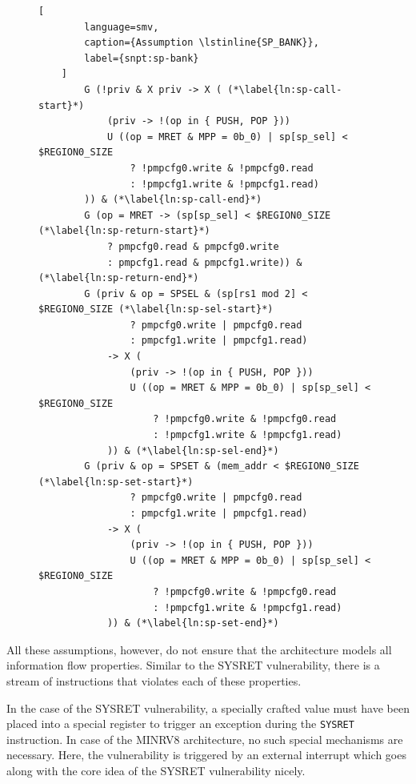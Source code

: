\begin{figure}
    \begin{lstlisting}[
        language=smv,
        caption={Assumption \lstinline{SP_BANK}},
        label={snpt:sp-bank}
    ]
        G (!priv & X priv -> X ( (*\label{ln:sp-call-start}*)
            (priv -> !(op in { PUSH, POP }))
            U ((op = MRET & MPP = 0b_0) | sp[sp_sel] < $REGION0_SIZE
                ? !pmpcfg0.write & !pmpcfg0.read
                : !pmpcfg1.write & !pmpcfg1.read)
        )) & (*\label{ln:sp-call-end}*)
        G (op = MRET -> (sp[sp_sel] < $REGION0_SIZE (*\label{ln:sp-return-start}*)
            ? pmpcfg0.read & pmpcfg0.write
            : pmpcfg1.read & pmpcfg1.write)) & (*\label{ln:sp-return-end}*)
        G (priv & op = SPSEL & (sp[rs1 mod 2] < $REGION0_SIZE (*\label{ln:sp-sel-start}*)
                ? pmpcfg0.write | pmpcfg0.read
                : pmpcfg1.write | pmpcfg1.read)
            -> X (
                (priv -> !(op in { PUSH, POP }))
                U ((op = MRET & MPP = 0b_0) | sp[sp_sel] < $REGION0_SIZE
                    ? !pmpcfg0.write & !pmpcfg0.read
                    : !pmpcfg1.write & !pmpcfg1.read)
            )) & (*\label{ln:sp-sel-end}*)
        G (priv & op = SPSET & (mem_addr < $REGION0_SIZE (*\label{ln:sp-set-start}*)
                ? pmpcfg0.write | pmpcfg0.read
                : pmpcfg1.write | pmpcfg1.read)
            -> X (
                (priv -> !(op in { PUSH, POP }))
                U ((op = MRET & MPP = 0b_0) | sp[sp_sel] < $REGION0_SIZE
                    ? !pmpcfg0.write & !pmpcfg0.read
                    : !pmpcfg1.write & !pmpcfg1.read)
            )) & (*\label{ln:sp-set-end}*)
    \end{lstlisting}
\end{figure}

All these assumptions, however, do not ensure that the architecture models all information flow properties.
Similar to the SYSRET vulnerability, there is a stream of instructions that violates each of these properties.


In the case of the SYSRET vulnerability, a specially crafted value must have been placed into a special register to trigger an exception during the \lstinline{SYSRET} instruction.
In case of the MINRV8 architecture, no such special mechanisms are necessary.
Here, the vulnerability is triggered by an external interrupt which goes along with the core idea of the SYSRET vulnerability nicely.

